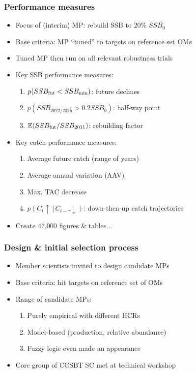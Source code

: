 \documentclass{beamer}
\begin{document}
\begin{frame}
\frametitle{Performance measures}
\begin{itemize}
    \item Focus of (interim) MP: rebuild SSB to 20\% $SSB_0$
    \item Base criteria: MP ``tuned'' to targets on reference set OMs
    \item Tuned MP then run on all relevant robustness trials
    \item Key SSB performance measures:
        \begin{enumerate}
            \item $p(SSB_{\rm fut}<SSB_{\rm min})$: future declines
            \item $p(SSB_{2022/2025}>0.2 SSB_0)$: half-way point
            \item $\mathbb{E}(SSB_{\rm fut}/SSB_{2011})$: rebuilding factor
        \end{enumerate}
    \item Key catch performance measures:
        \begin{enumerate}
            \item Average future catch (range of years)
            \item Average annual variation (AAV)
            \item Max. TAC decrease
            \item $p(C_{t}\uparrow\,|\,C_{t-\tau}\downarrow)$: down-then-up catch trajectories
        \end{enumerate}
       \item Create 47,000 figures \& tables...
\end{itemize}
\end{frame}
\begin{frame}
    \frametitle{Design \& initial selection process}
\begin{itemize}
    \item Member scientists invited to design candidate MPs
    \item Base criteria: hit targets on reference set of OMs
    \item Range of candidate MPs:
        \begin{enumerate}
            \item Purely empirical with different HCRs
            \item Model-based (production, relative abundance)
            \item Fuzzy logic even made an appearance
        \end{enumerate}
    \item Core group of CCSBT SC met at technical workshop
\end{itemize}
\end{frame}
\end{document}
